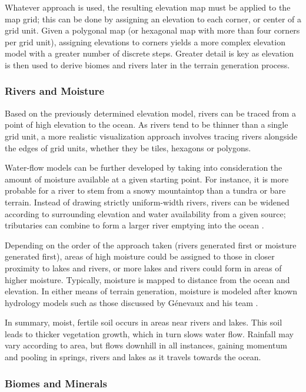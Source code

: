Whatever approach is used, the resulting elevation map must be applied to the map grid; this can be done by assigning an elevation to each corner, or center of a grid unit. Given a polygonal map (or hexagonal map with more than four corners per grid unit), assigning elevations to corners yields a more complex elevation model with a greater number of discrete steps. Greater detail is key as elevation is then used to derive biomes and rivers later in the terrain generation process.

\subsubsection{Rivers and Moisture}
Based on the previously determined elevation model, rivers can be traced from a point of high elevation to the ocean. As rivers tend to be thinner than a single grid unit, a more realistic visualization approach involves tracing rivers alongside the edges of grid units, whether they be tiles, hexagons or polygons.

Water-flow models can be further developed by taking into consideration the amount of moisture available at a given starting point. For instance, it is more probable for a river to stem from a snowy mountaintop than a tundra or bare terrain. Instead of drawing strictly uniform-width rivers, rivers can be widened according to surrounding elevation and water availability from a given source; tributaries can combine to form a larger river emptying into the ocean \cite{Genevaux:2013:TGU:2461912.2461996}.

Depending on the order of the approach taken (rivers generated first or moisture generated first), areas of high moisture could be assigned to those in closer proximity to lakes and rivers, or more lakes and rivers could form in areas of higher moisture. Typically, moisture is mapped to distance from the ocean and elevation. In either means of terrain generation, moisture is modeled after known hydrology models such as those discussed by G\'enevaux and his team \cite{Genevaux:2013:TGU:2461912.2461996}.

In summary, moist, fertile soil occurs in areas near rivers and lakes. This soil leads to thicker vegetation growth, which in turn slows water flow. Rainfall may vary according to area, but flows downhill in all instances, gaining momentum and pooling in springs, rivers and lakes as it travels towards the ocean.

\subsubsection{Biomes and Minerals}

